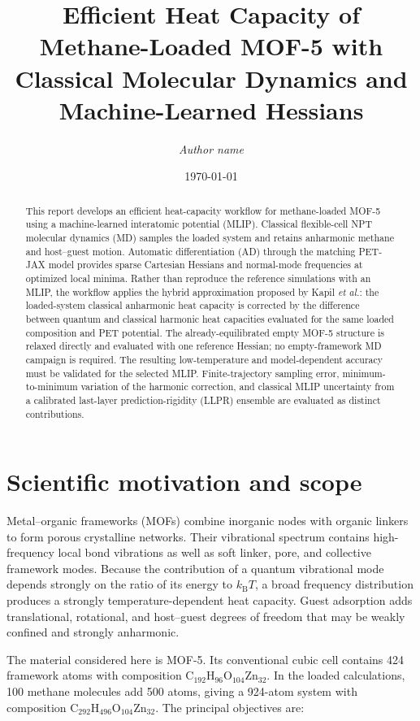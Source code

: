 \documentclass[10pt,a4paper,twocolumn]{article}
\title{Efficient Heat Capacity of Methane-Loaded MOF-5 with Classical Molecular Dynamics and Machine-Learned Hessians}
\author{\textit{Author name}}
\date{\today}
\begin{document}
\maketitle

\begin{abstract}
This report develops an efficient heat-capacity workflow for methane-loaded
MOF-5 using a machine-learned interatomic potential (MLIP). Classical
flexible-cell NPT molecular dynamics (MD) samples the loaded system and retains
anharmonic methane and host--guest motion. Automatic differentiation (AD)
through the matching PET-JAX model provides sparse Cartesian Hessians and
normal-mode frequencies at optimized local minima. Rather than reproduce the
reference simulations with an MLIP, the workflow applies the hybrid
approximation proposed by Kapil \emph{et al.}: the loaded-system classical
anharmonic heat capacity is corrected by the difference between quantum and
classical harmonic heat capacities evaluated for the same loaded composition
and PET potential. The already-equilibrated empty MOF-5 structure is relaxed
directly and evaluated with one reference Hessian; no empty-framework MD
campaign is required. The resulting low-temperature and model-dependent
accuracy must be validated for the selected MLIP. Finite-trajectory sampling
error, minimum-to-minimum variation of the harmonic correction, and classical
MLIP uncertainty from a calibrated last-layer prediction-rigidity (LLPR)
ensemble are evaluated as distinct contributions.
\end{abstract}

\section{Scientific motivation and scope}

Metal--organic frameworks (MOFs) combine inorganic nodes with organic linkers
to form porous crystalline networks. Their vibrational spectrum contains
high-frequency local bond vibrations as well as soft linker, pore, and
collective framework modes. Because the contribution of a quantum vibrational
mode depends strongly on the ratio of its energy to $k_{\mathrm B}T$, a broad
frequency distribution produces a strongly temperature-dependent heat
capacity. Guest adsorption adds translational, rotational, and host--guest
degrees of freedom that may be weakly confined and strongly anharmonic.

The material considered here is MOF-5. Its conventional cubic cell contains
424 framework atoms with composition
$\mathrm{C}_{192}\mathrm{H}_{96}\mathrm{O}_{104}\mathrm{Zn}_{32}$. In the
loaded calculations, 100 methane molecules add 500 atoms, giving a 924-atom
system with composition
$\mathrm{C}_{292}\mathrm{H}_{496}\mathrm{O}_{104}\mathrm{Zn}_{32}$.
The principal objectives are:
\end{document}
